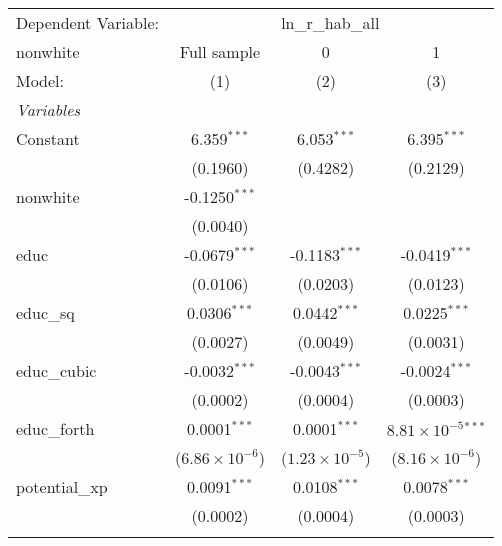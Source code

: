 
\begingroup
\centering
\begin{tabular}{lccc}
   \tabularnewline \midrule \midrule
   Dependent Variable: & \multicolumn{3}{c}{ln\_r\_hab\_all}\\
   nonwhite                        & Full sample             & 0                       & 1 \\   
   Model:                          & (1)                     & (2)                     & (3)\\  
   \midrule
   \emph{Variables}\\
   Constant                        & 6.359$^{***}$           & 6.053$^{***}$           & 6.395$^{***}$\\   
                                   & (0.1960)                & (0.4282)                & (0.2129)\\   
   nonwhite                        & -0.1250$^{***}$         &                         &   \\   
                                   & (0.0040)                &                         &   \\   
   educ                            & -0.0679$^{***}$         & -0.1183$^{***}$         & -0.0419$^{***}$\\   
                                   & (0.0106)                & (0.0203)                & (0.0123)\\   
   educ\_sq                        & 0.0306$^{***}$          & 0.0442$^{***}$          & 0.0225$^{***}$\\   
                                   & (0.0027)                & (0.0049)                & (0.0031)\\   
   educ\_cubic                     & -0.0032$^{***}$         & -0.0043$^{***}$         & -0.0024$^{***}$\\   
                                   & (0.0002)                & (0.0004)                & (0.0003)\\   
   educ\_forth                     & 0.0001$^{***}$          & 0.0001$^{***}$          & $8.81\times 10^{-5}$$^{***}$\\    
                                   & ($6.86\times 10^{-6}$)  & ($1.23\times 10^{-5}$)  & ($8.16\times 10^{-6}$)\\    
   potential\_xp                   & 0.0091$^{***}$          & 0.0108$^{***}$          & 0.0078$^{***}$\\   
                                   & (0.0002)                & (0.0004)                & (0.0003)\\   
$$
\end{tabular}
